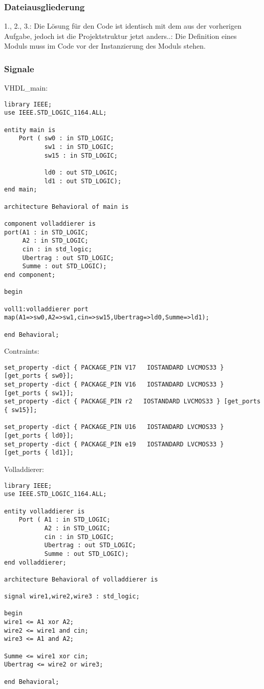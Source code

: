 \documentclass{article}
\begin{document}
\subsubsection{Dateiausgliederung}
1., 2., 3.: \newline
Die L\"osung f\"ur den Code ist identisch mit dem aus der vorherigen Aufgabe, jedoch ist die Projektstruktur jetzt anders..: \newline
Die Definition eines Moduls muss im Code vor der Instanzierung des Moduls stehen.\newline

\subsubsection{Signale}
VHDL\_main:\newline
\begin{verbatim}
library IEEE;
use IEEE.STD_LOGIC_1164.ALL;

entity main is
    Port ( sw0 : in STD_LOGIC;
           sw1 : in STD_LOGIC;
           sw15 : in STD_LOGIC;

           ld0 : out STD_LOGIC;
           ld1 : out STD_LOGIC);
end main;

architecture Behavioral of main is

component volladdierer is
port(A1 : in STD_LOGIC;
     A2 : in STD_LOGIC;
     cin : in std_logic;
     Ubertrag : out STD_LOGIC;
     Summe : out STD_LOGIC);
end component;

begin

voll1:volladdierer port map(A1=>sw0,A2=>sw1,cin=>sw15,Ubertrag=>ld0,Summe=>ld1);

end Behavioral;
\end{verbatim}
Contraints:\newline
\begin{verbatim}
set_property -dict { PACKAGE_PIN V17   IOSTANDARD LVCMOS33 } [get_ports { sw0}];
set_property -dict { PACKAGE_PIN V16   IOSTANDARD LVCMOS33 } [get_ports { sw1}];
set_property -dict { PACKAGE_PIN r2   IOSTANDARD LVCMOS33 } [get_ports { sw15}];

set_property -dict { PACKAGE_PIN U16   IOSTANDARD LVCMOS33 } [get_ports { ld0}];
set_property -dict { PACKAGE_PIN e19   IOSTANDARD LVCMOS33 } [get_ports { ld1}];
\end{verbatim}
Volladdierer:\newline
\begin{verbatim}
library IEEE;
use IEEE.STD_LOGIC_1164.ALL;

entity volladdierer is
    Port ( A1 : in STD_LOGIC;
           A2 : in STD_LOGIC;
           cin : in STD_LOGIC;
           Ubertrag : out STD_LOGIC;
           Summe : out STD_LOGIC);
end volladdierer;

architecture Behavioral of volladdierer is

signal wire1,wire2,wire3 : std_logic;

begin
wire1 <= A1 xor A2;
wire2 <= wire1 and cin;
wire3 <= A1 and A2;

Summe <= wire1 xor cin;
Ubertrag <= wire2 or wire3;

end Behavioral;
\end{verbatim}
\end{document}
